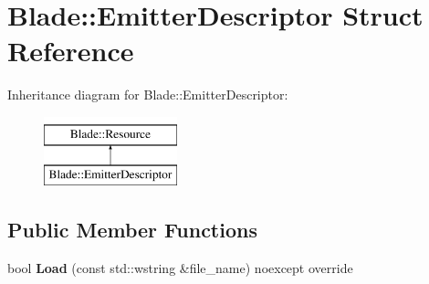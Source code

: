 \hypertarget{struct_blade_1_1_emitter_descriptor}{}\section{Blade\+:\+:Emitter\+Descriptor Struct Reference}
\label{struct_blade_1_1_emitter_descriptor}
Inheritance diagram for Blade\+:\+:Emitter\+Descriptor\+:\begin{figure}[H]
\begin{center}
\leavevmode
\includegraphics[height=2.000000cm]{struct_blade_1_1_emitter_descriptor}
\end{center}
\end{figure}
\subsection*{Public Member Functions}
\begin{DoxyCompactItemize}
\item 
\mbox{\label{struct_blade_1_1_emitter_descriptor_ac3bf4ccedee573630235f498a0c47822}} 
bool {\bfseries Load} (const std\+::wstring \&file\+\_\+name) noexcept override
\end{DoxyCompactItemize}
